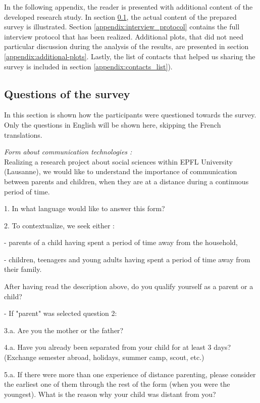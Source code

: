 \appendix

In the following appendix, the reader is presented with additional content of the developed research study. In section \ref{appendix:survey_questions}, the actual content of the prepared survey is illustrated. Section \ref{appendix:interview_protocol} contains the full interview protocol that has been realized. Additional plots, that did not need particular discussion during the analysis of the results, are presented in section \ref{appendix:additional-plots}. Lastly, the list of contacts that helped us sharing the survey is included in section \ref{appendix:contacts_list}).

\subsection{Questions of the survey}
\label{appendix:survey_questions}
In this section is shown how the participants were questioned towards the survey. Only the questions in English will be shown here, skipping the French translations.

\medskip \textit{Form about communication technologies :} \\
Realizing a research project about social sciences within EPFL University (Lausanne), we would like to understand the importance of communication between parents and children, when they are at a distance during a continuous period of time.

\vspace{4pt}
1. In what language would like to answer this form?

2. To contextualize, we seek either :

- parents of a child having spent a period of time away from the household,

- children, teenagers and young adults having spent a period of time away from their family.

After having read the description above, do you qualify yourself as a parent or a child?

\vspace{4pt}
\noindent - If "parent" was selected question 2: 

3.a. Are you the mother or the father?

4.a. Have you already been separated from your child for at least 3 days? (Exchange semester abroad, holidays, summer camp, scout, etc.)

5.a. If there were more than one experience of distance parenting, please consider the earliest one of them through the rest of the form (when you were the youngest). What is the reason why your child was distant from you? 

